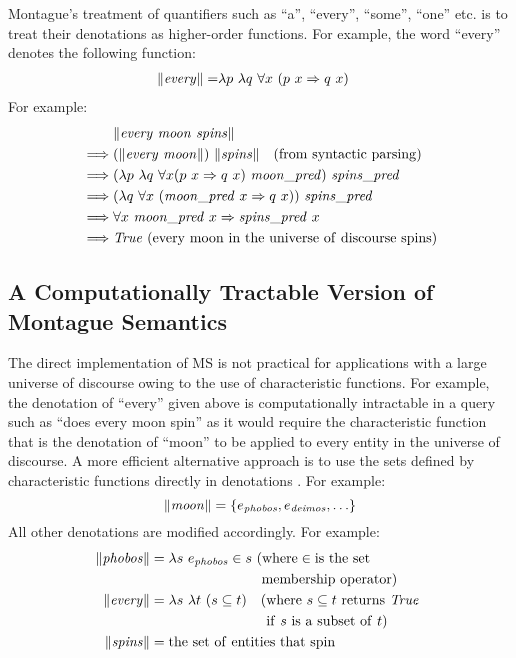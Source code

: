 \documentclass[../main.tex]{subfiles}
\begin{document}
\begin{refsection}
Montague's treatment of quantifiers such as ``a'', ``every'', ``some'', ``one'' etc. is to treat their
denotations as higher-order functions. For example, the word ``every'' denotes the following function:
\begin{align*}
	\lVert \mathit{\mathit{every}} \rVert =& \lambda p \  \lambda q \  \forall x \  (p \  x \Rightarrow q \  x)
\end{align*}
For example:
\begin{equation*}
	\begin{split}
		& \meaningof{\every \  \moon \  \spins} \\
		\implies&  (\meaningof{\every\ \moon}) \  \meaningof{\spins} \quad(\mathrm{from}\ \mathrm{syntactic}\ \mathrm{parsing}) \\
		\implies&  (\lambda p \  \lambda q \  \forall x (p \  x \Rightarrow q \  x) \  \wordpred{\moon}) \  \wordpred{\spins} \\
		\implies&  (\lambda q \  \forall x \  (\wordpred{\moon} \   x \Rightarrow q \   x)) \  \wordpred{spins} \\
		\implies&  \forall x \  \wordpred{\moon} \   x \Rightarrow \wordpred{spins} \   x \\
		\implies&  \True\ (\mathrm{every\ moon\ in\ the\ universe \ of\ discourse\ spins})
	\end{split}
\end{equation*}
\subsection{A Computationally Tractable Version of Montague Semantics} %
\label{icsc2020conf:frostmont}
The direct implementation of MS is not practical for applications with a large universe of discourse
owing to the use of characteristic functions. For example, the denotation of ``every'' given above is
computationally intractable in a query such as ``does every moon spin'' as it would require the
characteristic function that is the denotation of ``moon'' to be applied to every entity in the universe of
discourse. A more efficient alternative approach is to use the sets defined by characteristic functions
directly in denotations \cite{frost1989constructing, frost2002efficient}. For example:
\[ \lVert \mathit{moon} \rVert = \{e_{\mathit{phobos}} , e_{\mathit{deimos}}, \ldots\} \]
All other denotations are modified accordingly. For example:
\begin{align*}
	\meaningof{\phobos} &= \lambda s \ \entityassoc{\phobos}  \in s\ \mathrm{(where} \in  \mathrm{is\ the\ set} \\ & \qquad\qquad\qquad\quad\ \ \mathrm{\ membership\ operator)} \\
	\meaningof{\every} &= \lambda s \  \lambda t \ (s \subseteq t) \quad \mathrm{(where\ } s \subseteq t \mathrm{\ returns\ \True\ } \\
	& \qquad\qquad\qquad\qquad\ \mathrm{if\ } s \mathrm{\ is\ a\ subset\ of\ } t) \\
	\meaningof{\spins} &= \mathrm{the\ set\ of\ entities\ that\ spin}
\end{align*}


\end{refsection}
\end{document}
